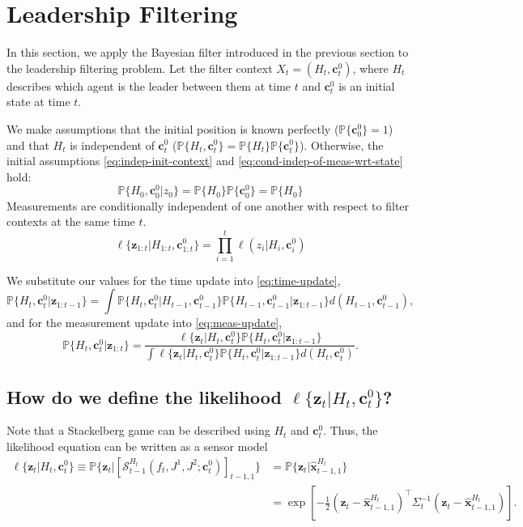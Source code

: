 \documentclass[11pt]{article}
\newcommand{\T}{\intercal}
\newcommand\stack[2]{\mathcal{S}^{#1}_{#2}}
\newcommand\costfn[1]{J^{#1}}
\newcommand\obs[1]{\bm{z}_{#1}}
\newcommand\prob[1]{\mathbb{P}{\{#1\}}}
\newcommand\lkhd[1]{\ell{\{#1\}}}
\newcommand\stackmeas[2]{\bm{\hat{x}}^{#1}_{#2}}
\newcommand\statecov[1]{\Sigma_{#1}}
\newcommand\initcond[1]{\bm{c}^{0}_{#1}}
\newcommand\comment[1]{\textcolor{purple}{#1}}
\begin{document}
\section{Leadership Filtering}
In this section, we apply the Bayesian filter introduced in the previous section to the leadership filtering problem. Let the filter context $X_t = (H_t, \initcond{t})$, where $H_t$ describes which agent is the leader between them at time $t$ and $\initcond{t}$ is an initial state at time $t$. 



We make assumptions that the initial position is known perfectly ($\prob{\initcond{0}} = 1$) and that $H_t$ is independent of $\initcond{t}$ ($\prob{H_t, \initcond{t}} = \prob{H_t}\prob{\initcond{t}}$). Otherwise, the initial assumptions \ref{eq:indep-init-context} and \ref{eq:cond-indep-of-meas-wrt-state} hold:
\begin{equation}
\prob{H_0, \initcond{0} | z_0} = \prob{H_0}\prob{\initcond{0}} = \prob{H_0}
\end{equation}
Measurements are conditionally independent of one another with respect to filter contexts at the same time $t$.
\begin{equation}
\lkhd{\obs{1:t} | H_{1:t}, \initcond{1:t}} = \prod_{i=1}^t \ell(z_i | H_i, \initcond{i})
\end{equation}


We substitute our values for the time update into \ref{eq:time-update},
\begin{equation}
\prob{H_t, \initcond{t} | \obs{1:t-1}} = \int \prob{H_t, \initcond{t} | H_{t-1}, \initcond{t-1}} \prob{H_{t-1}, \initcond{t-1} | \obs{1:t-1}} d(H_{t-1}, \initcond{{}t-1}),
\end{equation}
and for the measurement update into \ref{eq:meas-update},
\begin{equation}
\prob{H_t, \initcond{t} | \obs{1:t}} = \frac{\lkhd{\obs{t} | H_t, \initcond{t}} \prob{H_t, \initcond{t} | \obs{1:t-1}}}{\int \lkhd{\obs{t} | H_t, \initcond{t}} \prob{H_t, \initcond{t} | \obs{1:t-1}}  d(H_t, \initcond{t})}.
\end{equation}


\subsection{How do we define the likelihood $\lkhd{\obs{t} | H_t, \initcond{t}}$?}
Note that a Stackelberg game can be described using $H_t$ and $\initcond{t}$. Thus, the likelihood equation can be written as a sensor model
\begin{align}
\lkhd{\obs{t} | H_t, \initcond{t}} \equiv \prob{\obs{t} | \left[ \stack{H_{t}}{t-1}\left(f_t, \costfn{1}, \costfn{2}; \initcond{t} \right) \right]_{t-1, 1}} &= \prob{\obs{t} | \stackmeas{H_t}{t-1, 1}} \\
    &= \exp\left[-\frac{1}{2} \left(\obs{t} - \stackmeas{H_t}{t-1, 1}\right)^\T \statecov{t}^{-1} \left(\obs{t} - \stackmeas{H_t}{t-1, 1}\right) \right].
\end{align}
\end{document}
